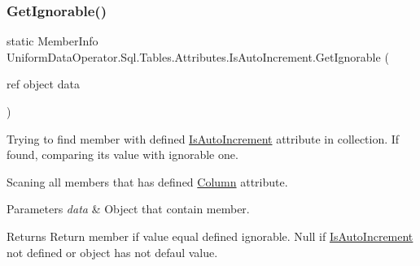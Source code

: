 \subsubsection{\texorpdfstring{Get\+Ignorable()}{GetIgnorable()}\hspace{0.1cm}{\footnotesize\ttfamily [1/2]}}
{\footnotesize\ttfamily static Member\+Info Uniform\+Data\+Operator.\+Sql.\+Tables.\+Attributes.\+Is\+Auto\+Increment.\+Get\+Ignorable (\begin{DoxyParamCaption}\item[{ref object}]{data }\end{DoxyParamCaption})\hspace{0.3cm}{\ttfamily [static]}}



Trying to find member with defined \mbox{\hyperlink{class_uniform_data_operator_1_1_sql_1_1_tables_1_1_attributes_1_1_is_auto_increment}{Is\+Auto\+Increment}} attribute in collection. If found, comparing it\textquotesingle{}s value with ignorable one. 

Scaning all members that has defined \mbox{\hyperlink{class_uniform_data_operator_1_1_sql_1_1_tables_1_1_attributes_1_1_column}{Column}} attribute. 


\begin{DoxyParams}{Parameters}
{\em data} & Object that contain member.\\
\hline
\end{DoxyParams}
\begin{DoxyReturn}{Returns}
Return member if value equal defined ignorable. Null if \mbox{\hyperlink{class_uniform_data_operator_1_1_sql_1_1_tables_1_1_attributes_1_1_is_auto_increment}{Is\+Auto\+Increment}} not defined or object has not defaul value.
\end{DoxyReturn}
\mbox{\label{class_uniform_data_operator_1_1_sql_1_1_tables_1_1_attributes_1_1_is_auto_increment_aab1ed2315b9ce4939f2a73b2ce43a11d}} 
